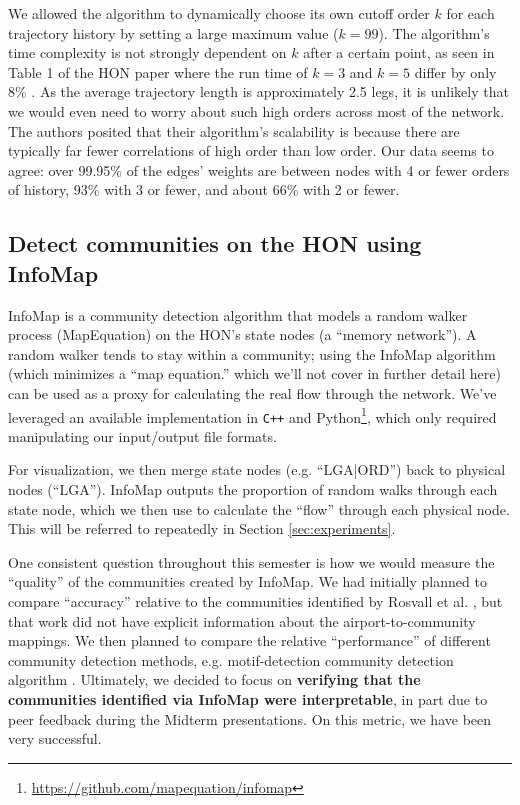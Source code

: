 \documentclass[sigconf]{acmart}
\begin{document}
We allowed the algorithm to dynamically choose its own cutoff order $k$ for each trajectory history by setting a large maximum value ($k = 99$). The algorithm's time complexity is not strongly dependent on $k$ after a certain point, as seen in Table 1 of the HON paper where the run time of $k = 3$ and $k = 5$ differ by only 8\% \cite{Xu2016}. As the average trajectory length is approximately 2.5 legs, it is unlikely that we would even need to worry about such high orders across most of the network. The authors posited that their algorithm's scalability is because there are typically far fewer correlations of high order than low order. Our data seems to agree: over 99.95\% of the edges' weights are between nodes with 4 or fewer orders of history, 93\% with 3 or fewer, and about 66\% with 2 or fewer.

\subsection{Detect communities on the HON using InfoMap}
InfoMap is a community detection algorithm that models a random walker process (MapEquation) on the HON's state nodes (a ``memory network'')\cite{Rosvall2009}. A random walker tends to stay within a community; using the InfoMap algorithm (which minimizes a ``map equation.'' which we'll not cover in further detail here) can be used as a proxy for calculating the real flow through the network. We've leveraged an available implementation in \texttt{C++} and Python\footnote{\url{https://github.com/mapequation/infomap}}, which only required manipulating our input/output file formats.

For visualization, we then merge state nodes (e.g. ``LGA|ORD'') back to physical nodes (``LGA''). InfoMap outputs the proportion of random walks through each state node, which we then use to calculate the ``flow'' through each physical node. This will be referred to repeatedly in Section \ref{sec:experiments}.

One consistent question throughout this semester is how we would measure the ``quality'' of the communities created by InfoMap. We had initially planned to compare ``accuracy'' relative to the communities identified by Rosvall et al. \cite{Rosvall2014}, but that work did not have explicit information about the airport-to-community mappings. We then planned to compare the relative ``performance'' of different community detection methods, e.g. motif-detection community detection algorithm \cite{Benson2016}. Ultimately, we decided to focus on \textbf{verifying that the communities identified via InfoMap were interpretable}, in part due to peer feedback during the Midterm presentations. On this metric, we have been very successful.
\end{document}
